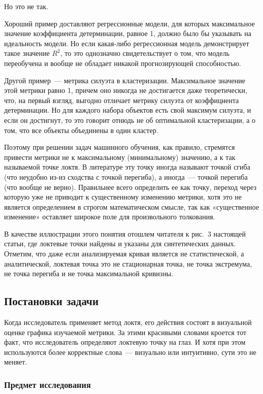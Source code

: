 \documentclass[a4paper,12pt]{article}
\begin{document}
Но это не так.

Хороший пример доставляют регрессионные модели, для которых максимальное значение коэффициента детерминации, равное 1, должно было бы указывать на идеальность модели. Но если какая-либо регрессионная модель демонстрирует такое значение $R^2$, то это однозначно свидетельствует о том, что модель переобучена и вообще не обладает никакой прогнозирующей способностью.

Другой пример — метрика силуэта в кластеризации. Максимальное значение этой метрики равно 1, причем оно никогда не достигается даже теоретически, что, на первый взгляд, выгодно отличает метрику силуэта от коэффициента детерминации. Но для каждого набора объектов есть свой максимум силуэта, и если он достигнут, то это говорит отнюдь не об оптимальной кластеризации, а о том, что все объекты объединены в один кластер.

Поэтому при решении задач машинного обучения, как правило, стремятся привести метрики не к максимальному (минимальному) значению, а к так называемой точке локтя. В литературе эту точку иногда называют точкой сгиба (что неудобно из-из сходства с точкой перегиба), а иногда — точкой перегиба (что вообще не верно). Правильнее всего определить ее как точку, переход через которую уже не приводит к существенному изменению метрики, хотя это не является определением в строгом математическом смысле, так как «существенное изменение» оставляет широкое поле для произвольного толкования.

В качестве иллюстрации этого понятия отошлем читателя к рис. 3 настоящей статьи, где локтевые точки найдены и указаны для синтетических данных. Отметим, что даже если анализируемая кривая является не статистической, а аналитической, локтевая точка это не стационарная точка, не точка экстремума, не точка перегиба и не точка максимальной кривизны. 

\subsection{Постановки задачи}
Когда исследователь применяет метод локтя, его действия состоят в визуальной оценке графика изучаемой метрики. За этими красивыми словами кроется тот факт, что исследователь определяют локтевую точку на глаз. И хотя при этом используются более корректные слова — визуально или интуитивно, сути это не меняет.

\subsubsection{Предмет исследования}
\end{document}
